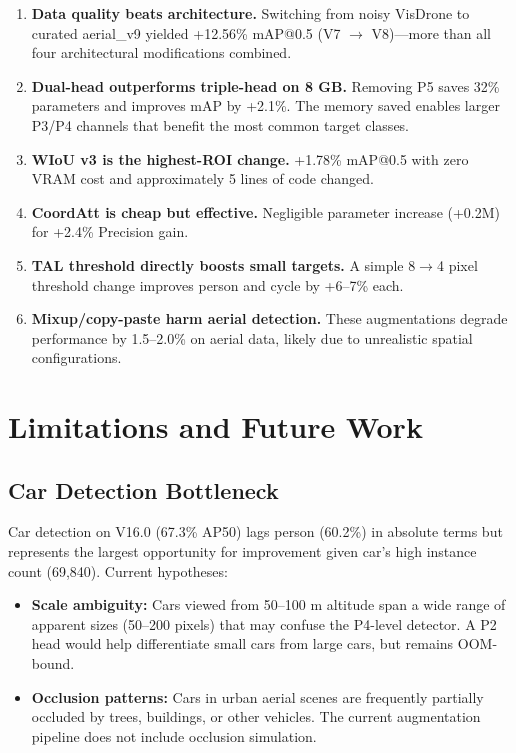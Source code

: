 \documentclass[11pt]{article}
\begin{document}
\begin{enumerate}[leftmargin=*]
    \item \textbf{Data quality beats architecture.} Switching from noisy VisDrone to curated
          aerial\_v9 yielded +12.56\% mAP@0.5 (V7 $\rightarrow$ V8)—more than all four
          architectural modifications combined.
    \item \textbf{Dual-head outperforms triple-head on 8 GB.} Removing P5 saves 32\% parameters
          and improves mAP by +2.1\%. The memory saved enables larger P3/P4 channels that
          benefit the most common target classes.
    \item \textbf{WIoU v3 is the highest-ROI change.} +1.78\% mAP@0.5 with zero VRAM cost and
          approximately 5 lines of code changed.
    \item \textbf{CoordAtt is cheap but effective.} Negligible parameter increase (+0.2M) for
          +2.4\% Precision gain.
    \item \textbf{TAL threshold directly boosts small targets.} A simple 8$\rightarrow$4 pixel
          threshold change improves person and cycle by +6--7\% each.
    \item \textbf{Mixup/copy-paste harm aerial detection.} These augmentations degrade performance
          by 1.5--2.0\% on aerial data, likely due to unrealistic spatial configurations.
\end{enumerate}

\section{Limitations and Future Work}

\subsection{Car Detection Bottleneck}

Car detection on V16.0 (67.3\% AP50) lags person (60.2\%) in absolute terms but represents the
largest opportunity for improvement given car's high instance count (69,840). Current hypotheses:

\begin{itemize}[leftmargin=*]
    \item \textbf{Scale ambiguity:} Cars viewed from 50--100 m altitude span a wide range of
          apparent sizes (50--200 pixels) that may confuse the P4-level detector. A P2 head
          would help differentiate small cars from large cars, but remains OOM-bound.
    \item \textbf{Occlusion patterns:} Cars in urban aerial scenes are frequently partially
          occluded by trees, buildings, or other vehicles. The current augmentation pipeline
          does not include occlusion simulation.
\end{itemize}
\end{document}

